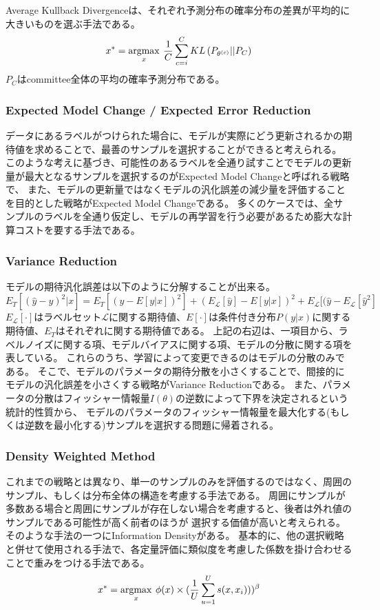 Average Kullback Divergenceは、それぞれ予測分布の確率分布の差異が平均的に大きいものを選ぶ手法である。
\begin{equation}
    x^{*} = \argmax_x \:  \frac{1}{C} \sum_{c=i}^C KL \, (P_{\theta^{(c)}} || P_C)
\end{equation}
$P_C$はcommittee全体の平均の確率予測分布である。

\subsubsection{Expected Model Change / Expected Error Reduction}
データにあるラベルがつけられた場合に、モデルが実際にどう更新されるかの期待値を求めることで、最善のサンプルを選択することができると考えられる。
このような考えに基づき、可能性のあるラベルを全通り試すことでモデルの更新量が最大となるサンプルを選択するのがExpected Model Changeと呼ばれる戦略で、
また、モデルの更新量ではなくモデルの汎化誤差の減少量を評価することを目的とした戦略がExpected Model Changeである。
多くのケースでは、全サンプルのラベルを全通り仮定し、モデルの再学習を行う必要があるため膨大な計算コストを要する手法である。

\subsubsection{Variance Reduction}
モデルの期待汎化誤差は以下のように分解することが出来る。
\begin{equation}
    E_T [(\hat{y} - y)^2|x] = E_T [(y - E[y|x])^2] + (E_{\mathcal{L}}[\hat{y}] - E[y|x])^2 + E_{\mathcal{L}} [(\hat{y} - E_{\mathcal{L}}[\hat{y}^2]
\end{equation}
$E_{\mathcal{L}}[\cdot]$はラベルセット$\mathcal{L}$に関する期待値、$E[\cdot]$は条件付き分布$P(y|x)$に関する期待値、$E_T$はそれぞれに関する期待値である。
上記の右辺は、一項目から、ラベルノイズに関する項、モデルバイアスに関する項、モデルの分散に関する項を表している。
これらのうち、学習によって変更できるのはモデルの分散のみである。
そこで、モデルのパラメータの期待分散を小さくすることで、間接的にモデルの汎化誤差を小さくする戦略がVariance Reductionである。
また、パラメータの分散はフィッシャー情報量$I(\theta)$の逆数によって下界を決定されるという統計的性質から、
モデルのパラメータのフィッシャー情報量を最大化する(もしくは逆数を最小化する)サンプルを選択する問題に帰着される。

\subsubsection{Density Weighted Method}
これまでの戦略とは異なり、単一のサンプルのみを評価するのではなく、周囲のサンプル、もしくは分布全体の構造を考慮する手法である。
周囲にサンプルが多数ある場合と周囲にサンプルが存在しない場合を考慮すると、後者は外れ値のサンプルである可能性が高く前者のほうが
選択する価値が高いと考えられる。
そのような手法の一つにInformation Densityがある。
基本的に、他の選択戦略と併せて使用される手法で、各定量評価に類似度を考慮した係数を掛け合わせることで重みをつける手法である。
\begin{equation}
    x^{*} = \argmax_x \:  \phi(x) \times (\frac{1}{U} \sum_{u=1}^{U} s(x, x_i)))^{\beta}
\end{equation}

